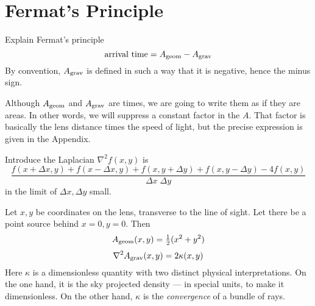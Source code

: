 \section{Fermat's Principle} \label{sec:Fermat}

Explain Fermat's principle
\begin{equation}
\hbox{arrival time} = A_{\rm geom} - A_{\rm grav}
\end{equation}
By convention, $A_{\rm grav}$ is defined in such a way that it is
negative, hence the minus sign.

Although $A_{\rm geom}$ and $A_{\rm grav}$ are times, we are going to
write them as if they are areas.  In other words, we will suppress a
constant factor in the $A$.  That factor is basically the lens
distance times the speed of light, but the precise expression is given
in the Appendix.

Introduce the Laplacian $\nabla^2 f(x,y)$ is
\begin{equation}
 \frac{ f(x+\Delta x, y) + f(x-\Delta x, y) +
        f(x, y+\Delta y) + f(x, y-\Delta y) - 4 f(x,y) }
      {\Delta x \; \Delta y}
\end{equation}
in the limit of $\Delta x,\Delta y$ small.

Let $x,y$ be coordinates on the lens, transverse to the line of sight.
Let there be a point source behind $x=0,y=0$.  Then
\begin{equation}
A_{\rm geom}(x,y) = {\textstyle\frac12}(x^2 + y^2)
\end{equation}
\begin{equation}
\nabla^2 A_{\rm grav}(x,y) = 2\kappa(x,y)
\end{equation}
Here $\kappa$ is a dimensionless quantity with two distinct physical
interpretations.  On the one hand, it is the sky projected density ---
in special units, to make it dimensionless.  On the other hand,
$\kappa$ is the {\em convergence\/} of a bundle of rays.